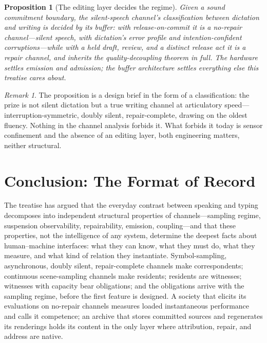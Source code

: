 \documentclass[11pt,oneside]{book}
\theoremstyle{plain}
\newtheorem{proposition}[theorem]{Proposition}
\theoremstyle{definition}
\theoremstyle{remark}
\newtheorem{remark}[theorem]{Remark}
\begin{document}
\begin{proposition}[The editing layer decides the regime]
Given a sound commitment boundary, the silent-speech channel's classification between dictation and writing is decided by its buffer: with release-on-commit it is a no-repair channel---silent speech, with dictation's error profile and intention-confident corruptions---while with a held draft, review, and a distinct release act it is a repair channel, and inherits the quality-decoupling theorem in full. The hardware settles emission and admission; the buffer architecture settles everything else this treatise cares about.
\end{proposition}

\begin{remark}
The proposition is a design brief in the form of a classification: the prize is not silent dictation but a true writing channel at articulatory speed---interruption-symmetric, doubly silent, repair-complete, drawing on the oldest fluency. Nothing in the channel analysis forbids it. What forbids it today is sensor confinement and the absence of an editing layer, both engineering matters, neither structural.
\end{remark}

\chapter{Conclusion: The Format of Record}

The treatise has argued that the everyday contrast between speaking and typing decomposes into independent structural properties of channels---sampling regime, suspension observability, repairability, emission, coupling---and that these properties, not the intelligence of any system, determine the deepest facts about human--machine interfaces: what they can know, what they must do, what they measure, and what kind of relation they instantiate. Symbol-sampling, asynchronous, doubly silent, repair-complete channels make correspondents; continuous scene-sampling channels make residents; residents are witnesses; witnesses with capacity bear obligations; and the obligations arrive with the sampling regime, before the first feature is designed. A society that elicits its evaluations on no-repair channels measures loaded instantaneous performance and calls it competence; an archive that stores committed sources and regenerates its renderings holds its content in the only layer where attribution, repair, and address are native.
\end{document}
